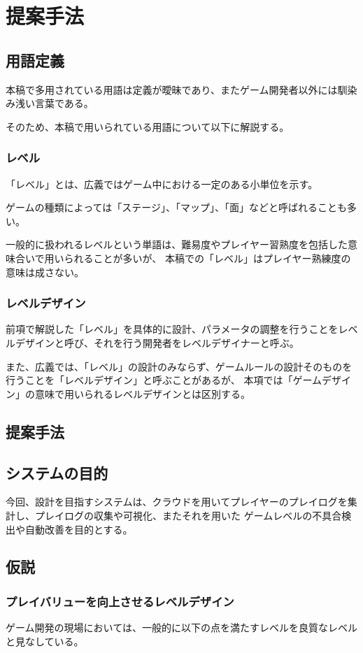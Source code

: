 \chapter{提案手法}
\section{用語定義}
本稿で多用されている用語は定義が曖昧であり、またゲーム開発者以外には馴染み浅い言葉である。

そのため、本稿で用いられている用語について以下に解説する。

\subsection{レベル}
「レベル」とは、広義ではゲーム中における一定のある小単位を示す。

ゲームの種類によっては「ステージ」、「マップ」、「面」などと呼ばれることも多い。

一般的に扱われるレベルという単語は、難易度やプレイヤー習熟度を包括した意味合いで用いられることが多いが、
本稿での「レベル」はプレイヤー熟練度の意味は成さない。


\subsection{レベルデザイン}
前項で解説した「レベル」を具体的に設計、パラメータの調整を行うことをレベルデザインと呼び、それを行う開発者をレベルデザイナーと呼ぶ。


また、広義では、「レベル」の設計のみならず、ゲームルールの設計そのものを行うことを「レベルデザイン」と呼ぶことがあるが、
本項では「ゲームデザイン」の意味で用いられるレベルデザインとは区別する。

\section{提案手法}

\section{システムの目的}
今回、設計を目指すシステムは、クラウドを用いてプレイヤーのプレイログを集計し、プレイログの収集や可視化、またそれを用いた
ゲームレベルの不具合検出や自動改善を目的とする。

\section{仮説}
\subsection{プレイバリューを向上させるレベルデザイン}
ゲーム開発の現場においては、一般的に以下の点を満たすレベルを良質なレベルと見なしている。

